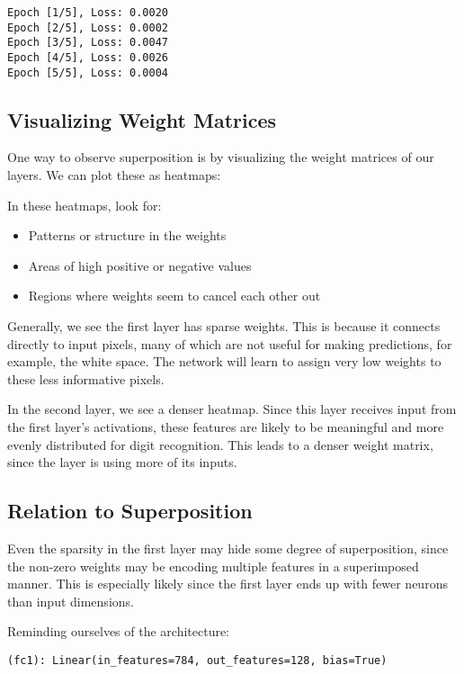 \documentclass[
  letterpaper,
  DIV=11,
  numbers=noendperiod]{scrreprt}
\providecommand{\tightlist}{%
  \setlength{\itemsep}{0pt}\setlength{\parskip}{0pt}}\usepackage{longtable,booktabs,array}
\begin{document}
\begin{verbatim}
Epoch [1/5], Loss: 0.0020
Epoch [2/5], Loss: 0.0002
Epoch [3/5], Loss: 0.0047
Epoch [4/5], Loss: 0.0026
Epoch [5/5], Loss: 0.0004
\end{verbatim}

\subsection{Visualizing Weight
Matrices}\label{visualizing-weight-matrices}

One way to observe superposition is by visualizing the weight matrices
of our layers. We can plot these as heatmaps:

In these heatmaps, look for:

\begin{itemize}
\tightlist
\item
  Patterns or structure in the weights
\item
  Areas of high positive or negative values
\item
  Regions where weights seem to cancel each other out
\end{itemize}

Generally, we see the first layer has sparse weights. This is because it
connects directly to input pixels, many of which are not useful for
making predictions, for example, the white space. The network will learn
to assign very low weights to these less informative pixels.

In the second layer, we see a denser heatmap. Since this layer receives
input from the first layer's activations, these features are likely to
be meaningful and more evenly distributed for digit recognition. This
leads to a denser weight matrix, since the layer is using more of its
inputs.

\subsection{Relation to Superposition}\label{relation-to-superposition}

Even the sparsity in the first layer may hide some degree of
superposition, since the non-zero weights may be encoding multiple
features in a superimposed manner. This is especially likely since the
first layer ends up with fewer neurons than input dimensions.

Reminding ourselves of the architecture:

\begin{verbatim}
(fc1): Linear(in_features=784, out_features=128, bias=True)
\end{verbatim}
\end{document}
